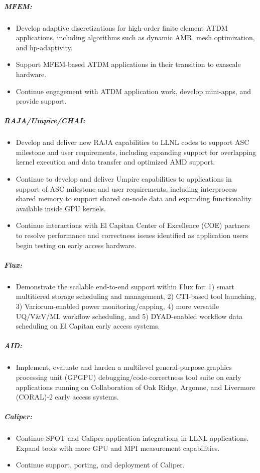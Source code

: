 \subparagraph{MFEM:}
\begin{itemize}
\item Develop adaptive discretizations for high-order finite element ATDM applications, including algorithms such as dynamic AMR, mesh optimization, and hp-adaptivity. 
\item Support MFEM-based ATDM applications in their transition to exascale hardware.  
\item Continue engagement with ATDM application work, develop mini-apps, and provide support.
\end{itemize}

\subparagraph{RAJA/Umpire/CHAI:}


\begin{itemize}
\item Develop and deliver new RAJA capabilities to LLNL codes to support ASC milestone and user requirements, including expanding support for overlapping kernel execution and data transfer and optimized AMD support.
\item Continue to develop and deliver Umpire capabilities to applications in support of ASC milestone and user requirements, including interprocess shared memory to support shared on-node data and expanding functionality available inside GPU kernels. 
\item Continue interactions with El Capitan Center of Excellence (COE) partners to resolve performance and correctness issues identified as application users begin testing on early access hardware. 

\end{itemize}

\subparagraph{Flux:}

\begin{itemize}
\item Demonstrate the scalable end-to-end support within Flux for: 1) smart multitiered storage scheduling and management, 2) CTI-based tool launching, 3) Variorum-enabled power monitoring/capping, 4) more versatile UQ/V\&V/ML workflow scheduling, and 5) DYAD-enabled workflow data scheduling on El Capitan early access systems. 
\end{itemize}

\subparagraph{AID:}
\begin{itemize}
\item Implement, evaluate and harden a multilevel general-purpose graphics processing unit (GPGPU) debugging/code-correctness tool suite on early applications running on Collaboration of Oak Ridge, Argonne, and Livermore (CORAL)-2 early access systems. 
\end{itemize}

\subparagraph{Caliper:}
\begin{itemize}
\item Continue SPOT and Caliper application integrations in LLNL applications. Expand tools with more GPU and MPI measurement capabilities.
\item Continue support, porting, and deployment of Caliper.
\end{itemize}
